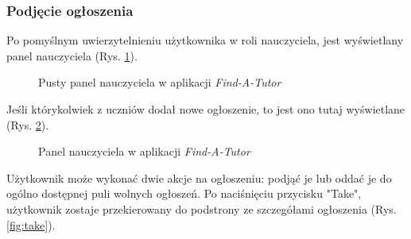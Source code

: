 \documentclass[12pt]{article}
\numberwithin{figure}{section}
\begin{document}
\begin{sloppypar}
\subsubsection{Podjęcie ogłoszenia}
Po pomyślnym uwierzytelnieniu użytkownika w roli nauczyciela, jest wyświetlany panel nauczyciela (Rys. \ref{fig:tutor-empty}).
\begin{figure}[!htbp] 
    \centering
    \caption{Pusty panel nauczyciela w aplikacji \textit{Find-A-Tutor}}
    \label{fig:tutor-empty}
\end{figure}

Jeśli którykolwiek z uczniów dodał nowe ogłoszenie, to jest ono tutaj wyświetlane (Rys. \ref{fig:tutor}).
\begin{figure}[!htbp] 
    \centering
    \caption{Panel nauczyciela w aplikacji \textit{Find-A-Tutor}}
    \label{fig:tutor}
\end{figure}
Użytkownik może wykonać dwie akcje na ogłoszeniu: podjąć je lub oddać je do ogólno dostępnej puli wolnych ogłoszeń. Po naciśnięciu przycisku "Take", użytkownik zostaje przekierowany do podstrony ze szczegółami ogłoszenia (Rys. \ref{fig:take}).


\end{sloppypar}
\end{document}

